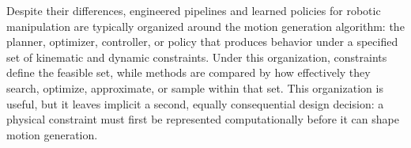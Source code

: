 

Despite their differences, engineered pipelines and learned policies for robotic manipulation are typically organized around the motion generation algorithm: the planner, optimizer, controller, or policy that produces behavior under a specified set of kinematic and dynamic constraints.
Under this organization, constraints define the feasible set, while methods are compared by how effectively they search, optimize, approximate, or sample within that set.
This organization is useful, but it leaves implicit a second, equally consequential design decision: a physical constraint must first be represented computationally before it can shape motion generation.

